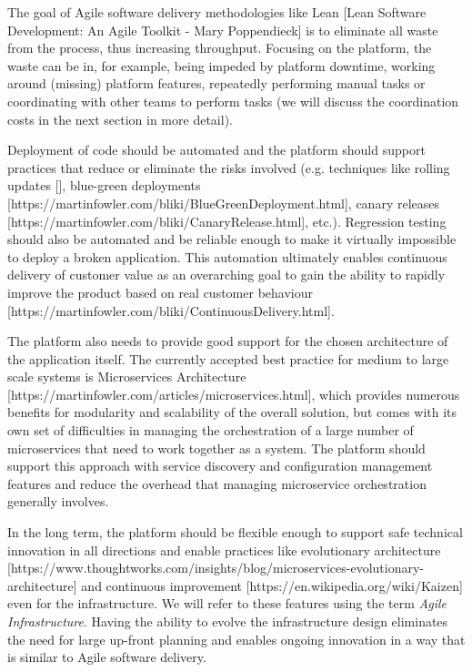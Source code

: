 \documentclass[reprint,amsmath,amssymb,aps]{revtex4-1}
\begin{document}
The goal of Agile software delivery methodologies like Lean [Lean Software Development: An Agile Toolkit - Mary Poppendieck] is to eliminate all waste from the process, thus increasing throughput. Focusing on the platform, the waste can be in, for example, being impeded by platform downtime, working around (missing) platform features, repeatedly performing manual tasks or coordinating with other teams to perform tasks (we will discuss the coordination costs in the next section in more detail).

Deployment of code should be automated and the platform should support practices that reduce or eliminate the risks involved (e.g. techniques like rolling updates [], blue-green deployments [https://martinfowler.com/bliki/BlueGreenDeployment.html], canary releases [https://martinfowler.com/bliki/CanaryRelease.html], etc.). Regression testing should also be automated and be reliable enough to make it virtually impossible to deploy a broken application. This automation ultimately enables continuous delivery of customer value as an overarching goal to gain the ability to rapidly improve the product based on real customer behaviour [https://martinfowler.com/bliki/ContinuousDelivery.html].

The platform also needs to provide good support for the chosen architecture of the application itself. The currently accepted best practice for medium to large scale systems is Microservices Architecture [https://martinfowler.com/articles/microservices.html], which provides numerous benefits for modularity and scalability of the overall solution, but comes with its own set of difficulties in managing the orchestration of a large number of microservices that need to work together as a system. The platform should support this approach with service discovery and configuration management features and reduce the overhead that managing microservice orchestration generally involves.

In the long term, the platform should be flexible enough to support safe technical innovation in all directions and enable practices like evolutionary architecture [https://www.thoughtworks.com/insights/blog/microservices-evolutionary-architecture] and continuous improvement [https://en.wikipedia.org/wiki/Kaizen] even for the infrastructure. We will refer to these features using the term \textit{Agile Infrastructure}. Having the ability to evolve the infrastructure design eliminates the need for large up-front planning and enables ongoing innovation in a way that is similar to Agile software delivery.
\end{document}
